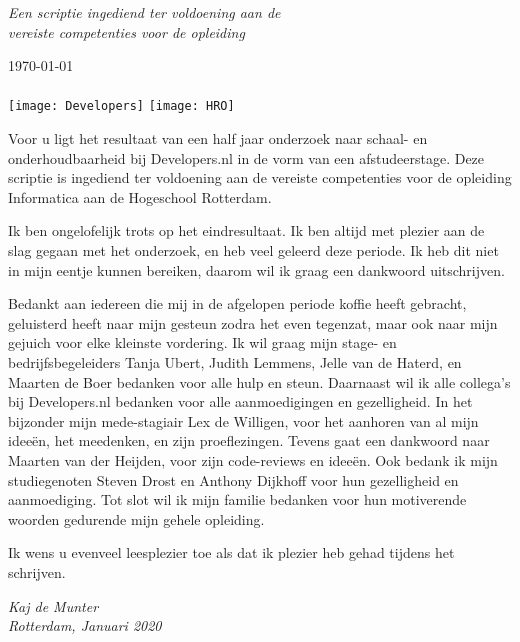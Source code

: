 \documentclass[
11pt, %
english, %
singlespacing, %
headsepline, %
]{formatting} %
\begin{document}
\begin{titlepage}
\begin{center}
		\vfill
		
		\large \textit{Een scriptie ingediend ter voldoening aan de\\ vereiste competenties voor de opleiding \degreename}\\[0.3cm]
		
		\deptname %
		
		\vfill
		
		{\large \today}\\[0.5cm] %
		{\Large \texttt{\versionnr}}\\[1cm]
		
		\texttt{[image: Developers]} \hspace{3cm}
		\texttt{[image: HRO]}

		\vfill
	\end{center}
\end{titlepage}


\begin{voorwoord}
	Voor u ligt het resultaat van een half jaar onderzoek naar schaal- en onderhoudbaarheid bij Developers.nl in de vorm van een afstudeerstage. Deze scriptie is ingediend ter voldoening aan de vereiste competenties voor de opleiding Informatica aan de Hogeschool Rotterdam.
	
	Ik ben ongelofelijk trots op het eindresultaat. Ik ben altijd met plezier aan de slag gegaan met het onderzoek, en heb veel geleerd deze periode. Ik heb dit niet in mijn eentje kunnen bereiken, daarom wil ik graag een dankwoord uitschrijven.
	
	Bedankt aan iedereen die mij in de afgelopen periode koffie heeft gebracht, geluisterd heeft naar mijn gesteun zodra het even tegenzat, maar ook naar mijn gejuich voor elke kleinste vordering. Ik wil graag mijn stage- en bedrijfsbegeleiders Tanja Ubert, Judith Lemmens, Jelle van de Haterd, en Maarten de Boer bedanken voor alle hulp en steun. Daarnaast wil ik alle collega's bij Developers.nl bedanken voor alle aanmoedigingen en gezelligheid. In het bijzonder mijn mede-stagiair Lex de Willigen, voor het aanhoren van al mijn ideeën, het meedenken, en zijn proeflezingen. Tevens gaat een dankwoord naar Maarten van der Heijden, voor zijn code-reviews en ideeën. Ook bedank ik mijn studiegenoten Steven Drost en Anthony Dijkhoff voor hun gezelligheid en aanmoediging. Tot slot wil ik mijn familie bedanken voor hun motiverende woorden gedurende mijn gehele opleiding.
	
	Ik wens u evenveel leesplezier toe als dat ik plezier heb gehad tijdens het schrijven.
	\begin{flushright}
		\textit{Kaj de Munter\\
		Rotterdam, Januari 2020}
	\end{flushright}
\end{voorwoord}
\end{document}
